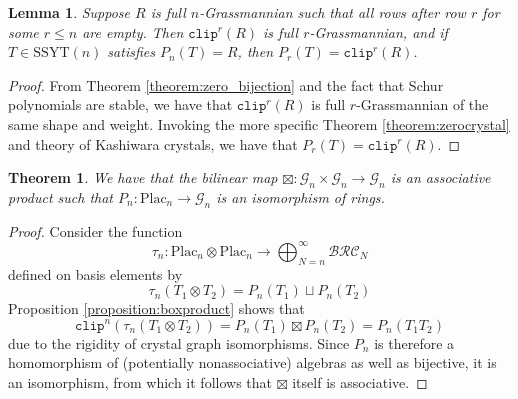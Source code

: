 \documentclass{amsart}
\newtheorem{lemma}{Lemma}[subsection]
\newtheorem{theorem}{Theorem}[section]
\theoremstyle{definition}
\theoremstyle{remark}
\numberwithin{equation}{subsection}
\newcommand{\grass}{\mathcal{G}}
\newcommand{\plac}{\mathrm{Plac}}
\newcommand{\clp}{\mathtt{clip}}
\newcommand{\BRC}{\mathcal{BRC}}
\newcommand{\SSYT}{\mathrm{SSYT}}
\begin{document}
\begin{lemma}
Suppose $R$ is full $n$-Grassmannian such that all rows after row $r$ for some $r\leq n$ are empty. Then $\clp^r(R)$ is full $r$-Grassmannian, and if $T\in \SSYT(n)$ satisfies $P_n(T)=R$, then $P_r(T)=\clp^r(R)$.
\end{lemma}
\begin{proof}
From Theorem \ref{theorem:zero_bijection} and the fact that Schur polynomials are stable, we have that $\clp^r(R)$ is full $r$-Grassmannian of the same shape and weight. Invoking the more specific Theorem \ref{theorem:zerocrystal} and theory of Kashiwara crystals, we have that $P_r(T)=\clp^r(R)$.
\end{proof}

\begin{theorem} \label{theorem:placticiso}
We have that the bilinear map $\boxtimes: \grass_n\times \grass_n\to\grass_n$ is an associative product such that $P_n:\plac_n\to \grass_n$ is an isomorphism of rings.
\end{theorem}
\begin{proof}
Consider the function 
$$\tau_n:\plac_n\otimes \plac_n\to \bigoplus_{N = n}^\infty \BRC_N$$ 
defined on basis elements by
$$\tau_n(T_1\otimes T_2) = P_n(T_1)\sqcup P_n(T_2)$$
Proposition \ref{proposition:boxproduct} shows that
$$\clp^n(\tau_n(T_1\otimes T_2)) = P_n(T_1)\boxtimes P_n(T_2) = P_n(T_1T_2)$$
due to the rigidity of crystal graph isomorphisms. Since $P_n$ is therefore a homomorphism of (potentially nonassociative) algebras as well as bijective, it is an isomorphism, from which it follows that $\boxtimes$ itself is associative.
\end{proof}
\end{document}

